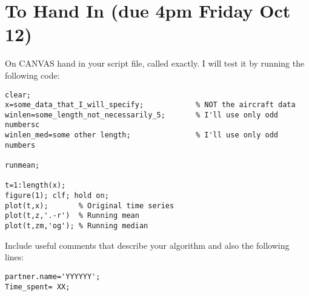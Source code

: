 \documentclass[letterpaper,11pt]{article}
\begin{document}
\section*{To Hand In (due 4pm Friday Oct 12)}

On CANVAS hand in your script file, called  exactly.  I will test it by running the
following code: 

\begin{boxedminipage}[h]{\linewidth}
\begin{lstlisting}
clear;
x=some_data_that_I_will_specify;            % NOT the aircraft data
winlen=some_length_not_necessarily_5;       % I'll use only odd numbersc
winlen_med=some other length;               % I'll use only odd numbers

runmean;

t=1:length(x);
figure(1); clf; hold on;
plot(t,x);       % Original time series
plot(t,z,'.-r')  % Running mean
plot(t,zm,'og'); % Running median
 \end{lstlisting}
\end{boxedminipage}
Include useful comments that describe your algorithm and also the following lines:
\begin{lstlisting}
partner.name='YYYYYY';
Time_spent= XX;
\end{lstlisting}
 
 
\end{document}
